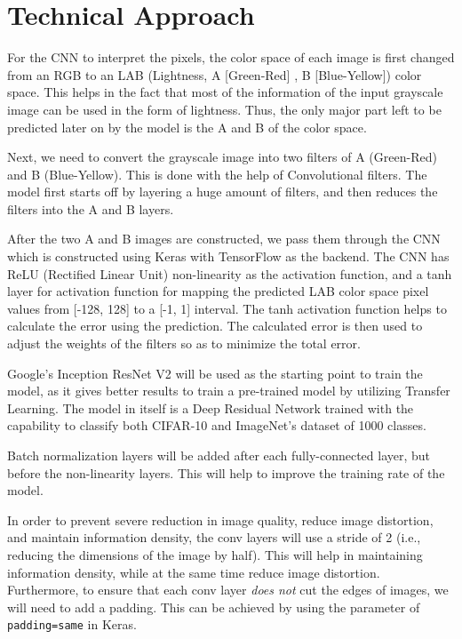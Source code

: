 \documentclass[10pt,twocolumn,letterpaper]{article}
\begin{document}
	\section{Technical Approach}
	For the CNN to interpret the pixels, the color space of each image is first changed from an RGB to an LAB (Lightness, A [Green-Red] , B [Blue-Yellow]) color space. This helps in the fact that most of the information of the input grayscale image can be used in the form of lightness. Thus, the only major part left to be predicted later on by the model is the A and B of the color space.

	Next, we need to convert the grayscale image into two filters of A (Green-Red) and B (Blue-Yellow). This is done with the help of Convolutional filters. The model first starts off by layering a huge amount of filters, and then reduces the filters into the A and B layers.

	After the two A and B images are constructed, we pass them through the CNN which is constructed using Keras with TensorFlow as the backend. The CNN has ReLU (Rectified Linear Unit) non-linearity as the activation function, and a tanh layer for activation function for mapping the predicted LAB color space pixel values from [-128, 128] to a [-1, 1] interval. The tanh activation function helps to calculate the error using the prediction. The calculated error is then used to adjust the weights of the filters so as to minimize the total error.

	Google's Inception ResNet V2 will be used as the starting point to train the model, as it gives better results to train a pre-trained model by utilizing Transfer Learning. The model in itself is a Deep Residual Network trained with the capability to classify both CIFAR-10 and ImageNet's dataset of 1000 classes.

	Batch normalization layers will be added after each fully-connected layer, but before the non-linearity layers. This will help to improve the training rate of the model.

	In order to prevent severe reduction in image quality, reduce image distortion, and maintain information density, the conv layers will use a stride of 2 (i.e., reducing the dimensions of the image by half). This will help in maintaining information density, while at the same time reduce image distortion. Furthermore, to ensure that each conv layer \textit{does not} cut the edges of images, we will need to add a padding. This can be achieved by using the parameter of \verb|padding=same| in Keras.
\end{document}
